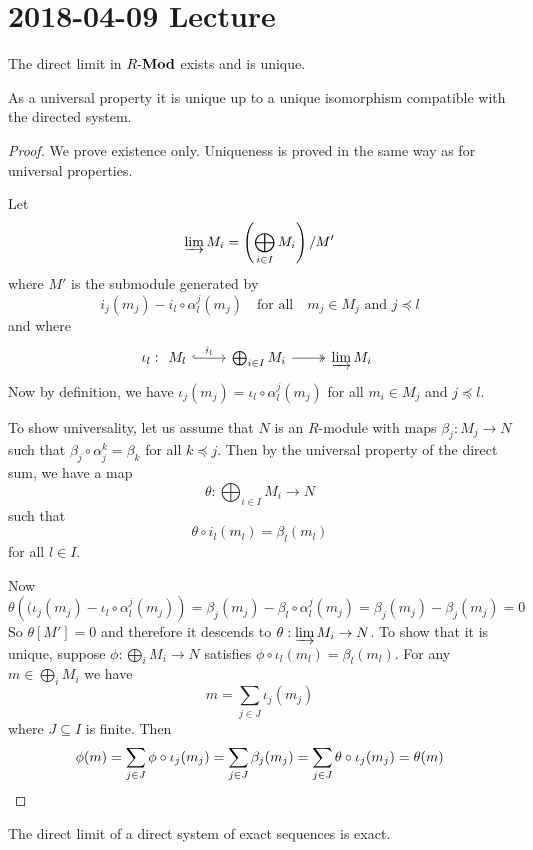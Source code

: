 \section{2018-04-09 Lecture}

\begin{prop}[1.14]
	The direct limit in $R\mbox{-}\mathbf{Mod}$ exists and is unique.
\end{prop}

\begin{rmk}
	As a universal property it is unique up to a unique isomorphism compatible with the directed system.
\end{rmk}

\begin{proof}
	We prove existence only.
	Uniqueness is proved in the same way as for universal properties.
	
	Let
	\[\varinjlim M_i = \left( \bigoplus_{i \in I} M_i \right)/M'\]
	where $M'$ is the submodule generated by
	\[i_j(m_j) - i_l\circ\alpha_l^j(m_j) \quad \text{for all} \quad m_j \in M_j \text{ and } j \preceq l\]
	and where
	\[\iota_l:
	\begin{tikzcd}
		M_l \ar[r, hookrightarrow, "i_l"] & \bigoplus_{i \in I} M_i \ar[r, twoheadrightarrow] & \varinjlim M_i
	\end{tikzcd}\]
	Now by definition, we have $\iota_j(m_j)=\iota_l\circ\alpha_l^j(m_j)$ for all $m_i \in M_j$ and $j \preceq l$.
	
	To show universality, let us assume that $N$ is an $R$-module with maps $\beta_j: M_j \to N$ such that $\beta_j \circ \alpha_j^k=\beta_k$ for all $k \preceq j$.
	Then by the universal property of the direct sum, we have a map
	\[\theta: \bigoplus_{i \in I} M_i \to N\]
	such that
	\[\theta \circ i_l(m_l) = \beta_l(m_l)\]
	for all $l \in I$.
	
	Now
	\[\theta\left((\iota_j(m_j)-\iota_l\circ\alpha_l^j(m_j)\right) = \beta_j(m_j)-\beta_l\circ\alpha_l^j(m_j) = \beta_j(m_j)-\beta_j(m_j) = 0\]
	So $\theta[M']=0$ and therefore it descends to $\theta: \varinjlim M_i \to N$.
	To show that it is unique, suppose $\phi: \bigoplus_i M_i \to N$ satisfies $\phi \circ \iota_l(m_l) = \beta_l(m_l)$.
	For any $m \in \bigoplus_i M_i$ we have
	\[m = \sum_{j \in J} \iota_j (m_j)\]
	where $J \subseteq I$ is finite.
	Then
	\[\phi(m) = \sum_{j \in J} \phi\circ\iota_j(m_j) = \sum_{j \in J} \beta_j(m_j) = \sum_{j \in J} \theta\circ\iota_j(m_j) = \theta(m) \qedhere\]
\end{proof}

\begin{prop}[1.15]
	The direct limit of a direct system of exact sequences is exact.
\end{prop}

